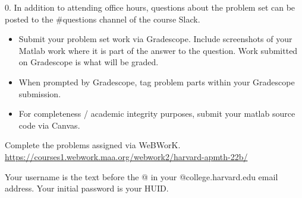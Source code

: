\documentclass[12pt,letterpaper]{exam}
\begin{document}
\begin{questions}


\item[0.] In addition to attending office hours, questions about the problem set can be posted to the \#questions channel of the course Slack.  
\begin{itemize}
    \item Submit your problem set work via Gradescope.  Include screenshots of your Matlab work where it is part of the answer to the question.  Work submitted on Gradescope is what will be graded.
    \item When prompted by Gradescope, tag problem parts within your Gradescope submission.
    \item For completeness / academic integrity purposes, submit your matlab source code via Canvas.
\end{itemize}

\item Complete the problems assigned via WeBWorK.  \url{https://courses1.webwork.maa.org/webwork2/harvard-apmth-22b/}

Your username is the text before the @ in your @college.harvard.edu email address.  Your initial password is your HUID.




\end{questions}
\end{document}
